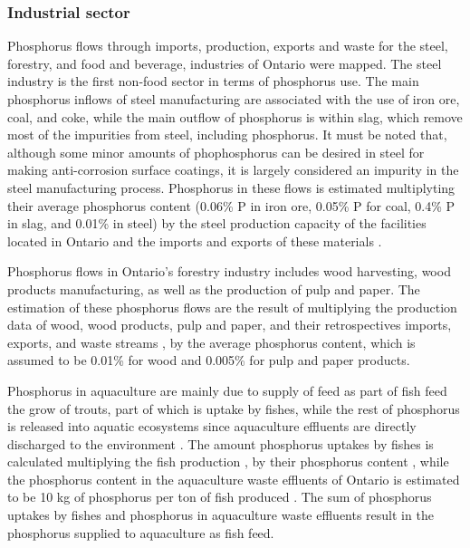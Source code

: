 \documentclass[authoryear]{elsarticle}
\begin{document}
\subsubsection{Industrial sector}
Phosphorus flows through imports, production, exports and waste for the steel, forestry, and food and beverage, industries of Ontario were mapped.
The steel industry is the first non-food sector in terms of phosphorus use. The main phosphorus inflows of steel manufacturing are associated with the use of iron ore, coal, and coke, while the main outflow of phosphorus is within slag, which remove most of the impurities from steel, including phosphorus. It must be noted that, although some minor amounts of phophosphorus can be desired in steel for making anti-corrosion surface coatings, it is largely considered an impurity in the steel manufacturing process. Phosphorus in these flows is estimated multiplyting their average phosphorus content (0.06\% P in iron ore, 0.05\% P for coal, 0.4\% P in slag, and 0.01\% in steel) \citep{yokoyama2007separation} by the steel production capacity of the facilities located in Ontario \citep{CheminfoServices, AlgomaSteel, Stelco, PFlows_Ontario} and the imports and exports of these materials \citep{WorldIntegratedTradeSolution, InterprovincialImportsExports}.

Phosphorus flows in Ontario's forestry industry includes wood harvesting, wood products manufacturing, as well as the production of pulp and paper. The estimation of these phosphorus flows are the result of multiplying the production data of wood, wood products, pulp and paper, and their retrospectives imports, exports, and waste streams \citep{CanadianForestServiceStatistics, InterprovincialImportsExports}, by the average phosphorus content, which is assumed to be 0.01\% for wood \citep{sardans2013tree} and 0.005\% for pulp and paper products.

Phosphorus in aquaculture are mainly due to supply of feed as part of fish feed the grow of trouts, part of which is uptake by fishes, while the rest of phosphorus is released into aquatic ecosystems since aquaculture effluents are directly discharged to the environment \citep{OntarioAquaculture}. The amount phosphorus uptakes by fishes
is calculated multiplying the fish production \citep{StatisticsCanadaAquaculture}, by their phosphorus content \citep{CanadianNutrientFile}, while the phosphorus content in the aquaculture waste effluents of Ontario is estimated to be 10 kg of phosphorus per ton of fish produced \citep{bureau2003chemical}. The sum of phosphorus uptakes by fishes and phosphorus in aquaculture waste effluents result in the phosphorus supplied to aquaculture as fish feed.
\end{document}
